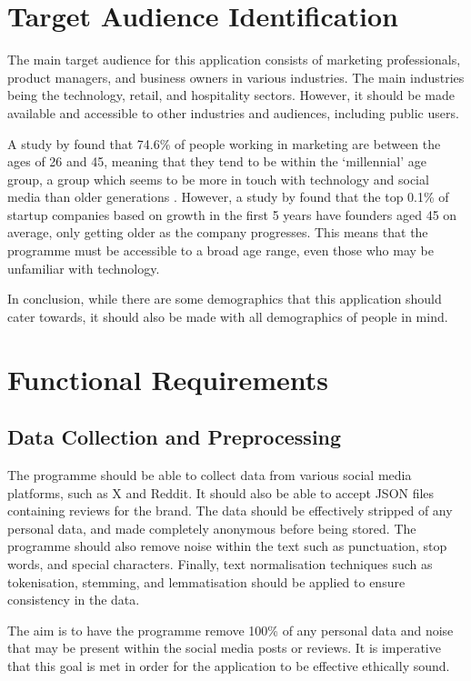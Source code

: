 \section{Target Audience Identification}
The main target audience for this application consists of marketing professionals, product managers, and business owners in various industries. The main industries being the technology, retail, and hospitality sectors. However, it should be made available and accessible to other industries and audiences, including public users.

A study by \citet{marketing2023survey} found that 74.6\% of people working in marketing are between the ages of 26 and 45, meaning that they tend to be within the `millennial' age group, a group which seems to be more in touch with technology and social media than older generations \citep{pew2019millennials}. However, a study by \citet{harvard2018research} found that the top 0.1\% of startup companies based on growth in the first 5 years have founders aged 45 on average, only getting older as the company progresses. This means that the programme must be accessible to a broad age range, even those who may be unfamiliar with technology.

In conclusion, while there are some demographics that this application should cater towards, it should also be made with all demographics of people in mind.

\section{Functional Requirements}

    \subsection{Data Collection and Preprocessing}
    The programme should be able to collect data from various social media platforms, such as X and Reddit. It should also be able to accept JSON files containing reviews for the brand. The data should be effectively stripped of any personal data, and made completely anonymous before being stored. The programme should also remove noise within the text such as punctuation, stop words, and special characters. Finally, text normalisation techniques such as tokenisation, stemming, and lemmatisation should be applied to ensure consistency in the data.

    The aim is to have the programme remove 100\% of any personal data and noise that may be present within the social media posts or reviews. It is imperative that this goal is met in order for the application to be effective ethically sound.

